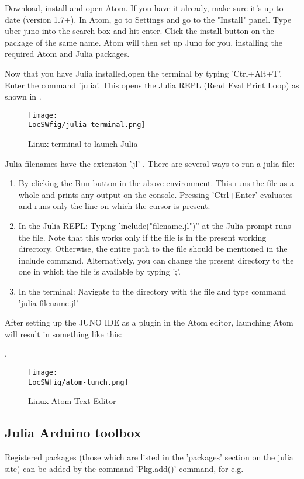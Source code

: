 Download, install and open Atom. If you have it already, make sure it's up to date (version 1.7+).
In Atom, go to Settings and go to the "Install" panel.
Type uber-juno into the search box and hit enter. Click the install button on the package of the same name.
Atom will then set up Juno for you, installing the required Atom and Julia packages.

Now that you have Julia installed,open the terminal by typing 'Ctrl+Alt+T'.
Enter the command 'julia'. This opens the Julia REPL (Read Eval Print Loop)
as shown in
.
\begin{figure}
      \centering
      \texttt{[image: \\LocSWfig/julia-terminal.png]}
      \caption{Linux terminal to launch Julia}
      \label{julia-terminal}
\end{figure}

Julia filenames have the extension '.jl' . There are several ways to run a julia file:

\begin{enumerate}
      \item By clicking the Run button in the above environment. This runs the file as a whole and prints any output on the console. Pressing 'Ctrl$+$Enter' evaluates and runs only the line on which the cursor is present.
      \item In the Julia REPL: Typing 'include("filename.jl")'' at the Julia prompt runs the file. Note that this works only if the file is in the present working directory. Otherwise, the entire path to the file should be mentioned in the include command. Alternatively, you can change the present directory to the one in which the file is available by typing ';'.
      \item In the terminal: Navigate to the directory with the file and type command 'julia filename.jl'
\end{enumerate}


After setting up the JUNO IDE as a plugin in the Atom editor, launching Atom will result in something like this:

.
\begin{figure}
      \centering
      \texttt{[image: \\LocSWfig/atom-lunch.png]}
      \caption{Linux Atom Text Editor}
      \label{atom-lunch}
\end{figure}

\subsection{Julia Arduino toolbox}
Registered packages (those which are listed in the 'packages' section on the julia site) can be added by the command 'Pkg.add()' command, for e.g.

